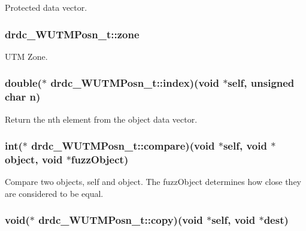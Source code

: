 Protected data vector. 

\hypertarget{structdrdc__WUTMPosn__t_932192c6467a673d6537e77421bdbb09}{
\subsubsection[zone]{ {\bf drdc\_\-WUTMPosn\_\-t::zone}}}
\label{structdrdc__WUTMPosn__t_932192c6467a673d6537e77421bdbb09}


UTM Zone. 

\hypertarget{structdrdc__WUTMPosn__t_93da68394919d2b437f14b2a6c622f31}{
\subsubsection[index]{\setlength{\rightskip}{0pt plus 5cm}double($\ast$ {\bf drdc\_\-WUTMPosn\_\-t::index})(void $\ast$self, unsigned char n)}}
\label{structdrdc__WUTMPosn__t_93da68394919d2b437f14b2a6c622f31}


Return the nth element from the object data vector. 

\hypertarget{structdrdc__WUTMPosn__t_f39deedc7e308d049bf768ffa35dad45}{
\subsubsection[compare]{\setlength{\rightskip}{0pt plus 5cm}int($\ast$ {\bf drdc\_\-WUTMPosn\_\-t::compare})(void $\ast$self, void $\ast$object, void $\ast$fuzzObject)}}
\label{structdrdc__WUTMPosn__t_f39deedc7e308d049bf768ffa35dad45}


Compare two objects, self and object. The fuzzObject determines how close they are considered to be equal. 

\hypertarget{structdrdc__WUTMPosn__t_4bdb61afed8ac02e0e2cbf077fe781ea}{
\subsubsection[copy]{\setlength{\rightskip}{0pt plus 5cm}void($\ast$ {\bf drdc\_\-WUTMPosn\_\-t::copy})(void $\ast$self, void $\ast$dest)}}
\label{structdrdc__WUTMPosn__t_4bdb61afed8ac02e0e2cbf077fe781ea}


